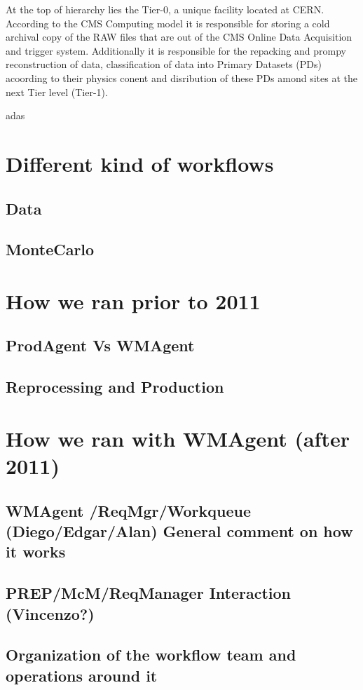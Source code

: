 \documentclass[journal, transmag]{IEEEtran}
\begin{document}
At the top of hierarchy lies the Tier-0, a unique facility located at CERN. According to the CMS Computing model it is responsible for storing a cold archival copy of the RAW files that are out of the CMS Online Data Acquisition and trigger system. Additionally it is responsible for the repacking and prompy reconstruction of data, classification of data into Primary Datasets (PDs) acoording to their physics conent and disribution of these PDs amond sites at the next Tier level (Tier-1).

adas


\section{Different kind of workflows}

\subsection{Data}
\subsection{MonteCarlo}

\section{How we ran prior to 2011}
\subsection{ProdAgent Vs WMAgent}
\subsection{Reprocessing and Production}

\section{How we ran with WMAgent (after 2011)}
\subsection{WMAgent /ReqMgr/Workqueue (Diego/Edgar/Alan) General comment on how it works}
\subsection{PREP/McM/ReqManager Interaction (Vincenzo?)}
\subsection{Organization of the workflow team and operations around it }
\end{document}
